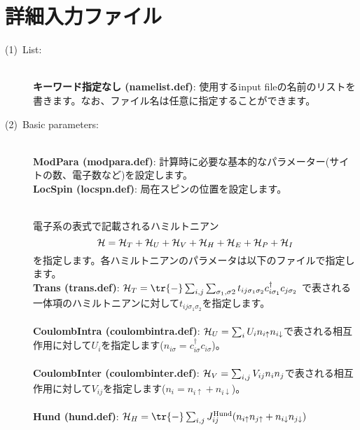 \newpage
\section{詳細入力ファイル}
\label{Ch:HowToExpert}

\begin{description}
\item[(1)~List:]
~\\{\bf キーワード指定なし (namelist.def)}:
使用するinput fileの名前のリストを書きます。なお、ファイル名は任意に指定することができます。
\item[(2)~Basic parameters:]
~\\{\bf ModPara (modpara.def)}: 計算時に必要な基本的なパラメーター(サイトの数、電子数など)を設定します。
~\\{\bf LocSpin (locspn.def)}: 局在スピンの位置を設定します。
\item[] 
~\\電子系の表式で記載されるハミルトニアン
\begin{equation}
{\cal H}={\cal H}_T+{\cal H}_U+{\cal H}_V+{\cal H}_H+{\cal H}_E+{\cal H}_P+{\cal H}_I
\end{equation}
を指定します。各ハミルトニアンのパラメータは以下のファイルで指定します。
~\\{\bf Trans (trans.def)}: 
${\cal H}_T=\tr{-}\sum_{i, j}\sum_{\sigma_1, \sigma2}t_{ij\sigma_1\sigma_2} c_{i\sigma_1}^{\dag}c_{j\sigma_2}$
で表される一体項のハミルトニアンに対して$t_{ij\sigma_1\sigma_2}$を指定します。\\
~\\{\bf CoulombIntra (coulombintra.def)}: 
${\cal H}_U=\sum_{i} U_i n_ {i \uparrow}n_{i \downarrow}$で表される相互作用に対して$U_i$を指定します($n_{i \sigma}=c_{i\sigma}^{\dag}c_{i\sigma}$)。\\
~\\{\bf CoulombInter (coulombinter.def)}: 
${\cal H}_V=\sum_{i,j} V_{ij}n_ {i}n_{j}$で表される相互作用に対して$V_{ij}$を指定します($n_i=n_{i\uparrow}+n_{i\downarrow}$)。\\
~\\{\bf Hund (hund.def)}: 
${\cal H}_H=\tr{-}\sum_{i,j}J_{ij}^{\rm Hund} (n_{i\uparrow}n_{j\uparrow}+n_{i\downarrow}n_{j\downarrow})$

\end{description}
